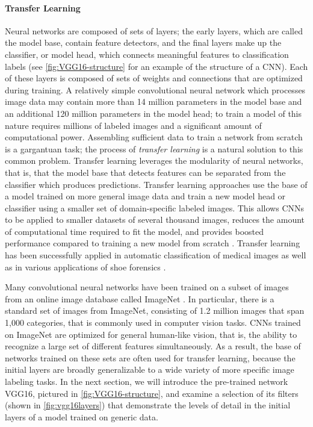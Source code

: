\documentclass{article}\usepackage[]{graphicx}\usepackage[table]{xcolor}
\begin{document}
\paragraph{Transfer Learning}
Neural networks are composed of sets of layers; the early layers, which are called the model base, contain feature detectors, and the final layers make up the classifier, or model head, which connects meaningful features to classification labels (see \autoref{fig:VGG16-structure} for an example of the structure of a CNN). Each of these layers is composed of sets of weights and connections that are optimized during training. A relatively simple convolutional neural network which processes image data may contain more than 14 million parameters in the model base and an additional 120 million parameters in the model head; to train a model of this nature requires millions of labeled images and a significant amount of computational power. Assembling sufficient data to train a network from scratch is a gargantuan task; the process of \emph{transfer learning} is a natural solution to this common problem. Transfer learning leverages the modularity of neural networks, that is, that the model base that detects features can be separated from the classifier which produces predictions. Transfer learning approaches use the base of a model trained on more general image data and train a new model head or classifier using a smaller set of domain-specific labeled images\citep{oquabLearningTransferringMidlevel2014}. This allows CNNs to be applied to smaller datasets of several thousand images, reduces the amount of computational time required to fit the model, and provides boosted performance compared to training a new model from scratch \citep{yosinskiHowTransferableAre2014}. Transfer learning has been successfully applied in automatic classification of medical images \citep{shinDeepConvolutionalNeural2016} as well as in various applications of shoe forensics \citep{kongCrossDomainForensicShoeprint2017,kongCrossDomainImageMatching2019a,zhangAdaptingConvolutionalNeural2017}.

Many convolutional neural networks have been trained on a subset of images from an online image database called ImageNet \citep{dengImageNetLargeScaleHierarchical}. In particular, there is a standard set of images from ImageNet, consisting of 1.2 million images that span 1,000 categories, that is commonly used in computer vision tasks. CNNs trained on ImageNet are optimized for general human-like vision, that is, the ability to recognize a large set of different features simultaneously. As a result, the base of networks trained on these sets are often used for transfer learning, because the initial layers are broadly generalizable to a wide variety of more specific image labeling tasks. In the next section, we will introduce the pre-trained network VGG16, pictured in \autoref{fig:VGG16-structure}, and examine a selection of its filters (shown in \autoref{fig:vgg16layers}) that demonstrate the levels of detail in the initial layers of a model trained on generic data.
\end{document}
